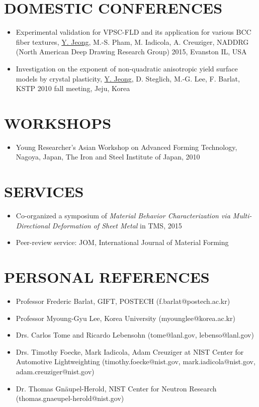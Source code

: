 \documentclass{res}
\begin{document}
\begin{resume}
  \section{DOMESTIC CONFERENCES}
  \begin{itemize}
  \item Experimental validation for VPSC-FLD and its application for various BCC fiber textures, \underline{Y. Jeong}, M.-S. Pham, M. Iadicola, A. Creuziger, NADDRG (North American Deep Drawing Research Group) 2015, Evanston IL, USA
  \item Investigation on the exponent of non-quadratic anisotropic yield surface models by crystal plasticity, \underline{Y. Jeong}, D. Steglich, M.-G. Lee, F. Barlat, KSTP 2010 fall meeting, Jeju, Korea
  \end{itemize}

  \section{WORKSHOPS}
  \begin{itemize}
  \item Young Researcher's Asian Workshop on Advanced Forming Technology, Nagoya, Japan, The Iron and Steel Institute of Japan, 2010
  \end{itemize}

  \section{SERVICES}
  \begin{itemize}
  \item Co-organized a symposium of {\it Material Behavior Characterization via Multi-Directional Deformation of Sheet Metal} in TMS, 2015
  \item Peer-review service: JOM, International Journal of Material Forming
  \end{itemize}

  \section{PERSONAL REFERENCES}
  \begin{itemize}
  \item Professor Frederic Barlat, GIFT, POSTECH (f.barlat@postech.ac.kr)
  \item Professor Myoung-Gyu Lee, Korea University (myounglee@korea.ac.kr)
  \item Drs. Carlos Tome and Ricardo Lebensohn (tome@lanl.gov, lebenso@lanl.gov)
  \item Drs. Timothy Foecke, Mark Iadicola, Adam Creuziger at NIST Center for Automotive Lightweighting (timothy.foecke@nist.gov, mark.iadicola@nist.gov, adam.creuziger@nist.gov)
  \item Dr. Thomas Gn\"aupel-Herold, NIST Center for Neutron Research (thomas.gnaeupel-herold@nist.gov)
  \end{itemize}

\end{resume}
\end{document}
